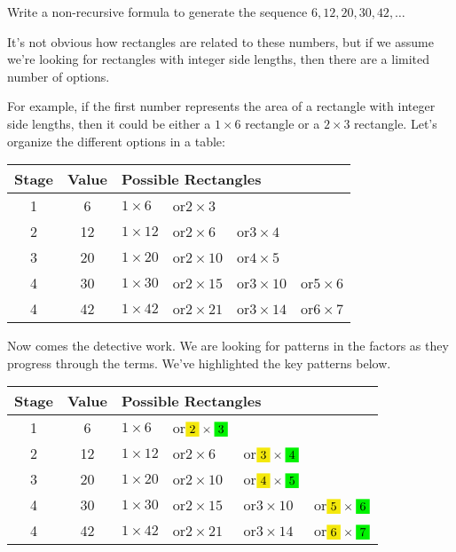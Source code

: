 \begin{boxedex}
Write a non-recursive formula to generate the sequence $6, 12, 20, 30, 42,\dotsc$

\exsoln{} It's not obvious how rectangles are related to these numbers, but if we assume we're looking for rectangles with integer side lengths, then there are a limited number of options.

For example, if the first number represents the area of a rectangle with integer side lengths, then it could be either a $1\times6$ rectangle or a $2\times3$ rectangle. Let's organize the different options in a table:

\begin{center}
\begin{tabular}{c|c|llll}
Stage		& Value		& \multicolumn{4}{l}{Possible Rectangles}
\\\hline
1			& 6			& $1 \times 6$
						& or\quad $2 \times 3$
						& ~
\\
2			& 12		& $1 \times 12$
						& or\quad $2 \times 6$
						& or\quad $3 \times 4$
\\
3			& 20		& $1 \times 20$
						& or\quad $2 \times 10$
						& or\quad $4 \times 5$
\\
4			& 30		& $1 \times 30$
						& or\quad $2 \times 15$
						& or\quad $3 \times 10$
						& or\quad $5 \times 6$
\\
4			& 42		& $1 \times 42$
						& or\quad $2 \times 21$
						& or\quad $3 \times 14$
						& or\quad $6 \times 7$
\\
\end{tabular}
\end{center}

Now comes the detective work. We are looking for patterns in the factors as they progress through the terms. We've highlighted the key patterns below.

\begin{center}
\begin{tabular}{c|c|llll}
Stage		& Value		& \multicolumn{4}{l}{Possible Rectangles}
\\\hline
1			& 6			& $1 \times 6$
						& or\quad $\colorbox{yellow!95!black}{2} \times \colorbox{green!95!black}{3}$
						& ~
\\
2			& 12		& $1 \times 12$
						& or\quad $2 \times 6$
						& or\quad $\colorbox{yellow!95!black}{3} \times \colorbox{green!95!black}{4}$
\\
3			& 20		& $1 \times 20$
						& or\quad $2 \times 10$
						& or\quad $\colorbox{yellow!95!black}{4} \times \colorbox{green!95!black}{5}$
\\
4			& 30		& $1 \times 30$
						& or\quad $2 \times 15$
						& or\quad $3 \times 10$
						& or\quad $\colorbox{yellow!95!black}{5} \times \colorbox{green!95!black}{6}$
\\
4			& 42		& $1 \times 42$
						& or\quad $2 \times 21$
						& or\quad $3 \times 14$
						& or\quad $\colorbox{yellow!95!black}{6} \times \colorbox{green!95!black}{7}$
\\
\end{tabular}
\end{center}


\end{boxedex}
